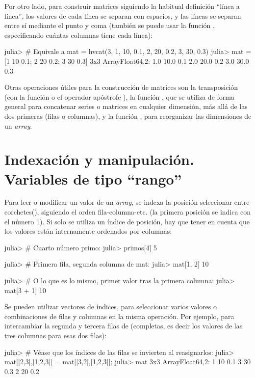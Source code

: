 Por otro lado, para construir matrices siguiendo la habitual definición ``línea a línea'', los valores de cada línea se separan con espacios, y las líneas se separan entre sí mediante el punto y coma (también se puede usar la función , especificando cuántas columnas tiene cada línea):

\begin{jlconcode}
julia> # Equivale a mat = hvcat(3, 1, 10, 0.1, 2, 20, 0.2, 3, 30, 0.3)
julia> mat = [1 10 0.1; 2 20 0.2; 3 30 0.3]
3x3 Array{Float64,2}:
 1.0 10.0 0.1
 2.0 20.0 0.2
 3.0 30.0 0.3
\end{jlconcode}

Otras operaciones útiles para la construcción de matrices son la transposición (con la función  o el operador apóstrofe ), la función , que se utiliza de forma general para concatenar series o matrices en cualquier dimensión, más allá de las dos primeras (filas o columnas), y la función , para reorganizar las dimensiones de un \emph{array}.


\section{Indexación y manipulación. Variables de tipo ``rango''}

Para leer o modificar un valor de un \emph{array}, se indexa la posición seleccionar entre corchetes(\jl{[]}), siguiendo el orden fila-columna-etc. (la primera posición se indica con el número 1). Si solo se utiliza un índice de posición, hay que tener en cuenta que los valores están internamente ordenados por columnas:

\begin{jlconcode}
julia> # Cuarto número primo:
julia> primos[4]
5

julia> # Primera fila, segunda columna de mat:
julia> mat[1, 2]
10

julia> # O lo que es lo mismo, primer valor tras la primera columna:
julia> mat[3 + 1]
10
\end{jlconcode}

Se pueden utilizar vectores de índices, para seleccionar varios valores o combinaciones de filas y columnas en la misma operación. Por ejemplo, para intercambiar la segunda y tercera filas de  (completas, es decir los valores de las tres columnas para esas dos filas):

\begin{jlconcode}
julia> # Véase que los índices de las filas se invierten al reasignarlos:
julia> mat[[2,3],[1,2,3]] = mat[[3,2],[1,2,3]];
julia> mat
3x3 Array{Float64,2}:
 1 10 0.1
 3 30 0.3
 2 20 0.2
\end{jlconcode}

